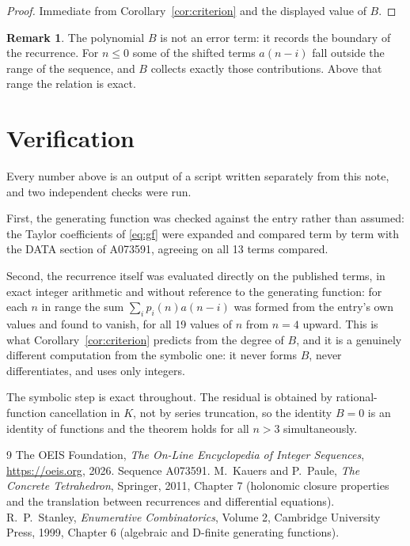 \documentclass[11pt,a4paper]{article}
\theoremstyle{plain}
\theoremstyle{definition}
\newtheorem{remark}[theorem]{Remark}
\begin{document}
\begin{proof}
Immediate from Corollary~\ref{cor:criterion} and the displayed value of $B$.
\end{proof}

\begin{remark}
The polynomial $B$ is not an error term: it records the boundary of the recurrence. For
$n\le0$ some of the shifted terms $a(n-i)$ fall outside the range of the sequence,
and $B$ collects exactly those contributions. Above that range the relation is exact.
\end{remark}

\section{Verification}

Every number above is an output of a script written separately from this note, and two
independent checks were run.

First, the generating function was checked against the entry rather than assumed: the
Taylor coefficients of \eqref{eq:gf} were expanded and compared term by term with the DATA
section of A073591, agreeing on all 13 terms compared.

Second, the recurrence itself was evaluated directly on the published terms, in exact
integer arithmetic and without reference to the generating function: for each $n$ in range
the sum $\sum_{i}p_{i}(n)a(n-i)$ was formed from the entry's own values and found to
vanish, for all 19 values of $n$ from $n=4$ upward. This is what
Corollary~\ref{cor:criterion} predicts from the degree of $B$, and it is a genuinely
different computation from the symbolic one: it never forms $B$, never differentiates, and
uses only integers.

The symbolic step is exact throughout. The residual is obtained by rational-function
cancellation in $K$, not by series truncation, so the identity $B=0$ is an
identity of functions and the theorem holds for all $n>3$ simultaneously.

\begin{thebibliography}{9}
 The OEIS Foundation, \emph{The On-Line Encyclopedia of Integer Sequences},
\url{https://oeis.org}, 2026. Sequence A073591.
 M.~Kauers and P.~Paule, \emph{The Concrete Tetrahedron}, Springer, 2011,
Chapter 7 (holonomic closure properties and the translation between recurrences and
differential equations).
 R.~P.~Stanley, \emph{Enumerative Combinatorics}, Volume 2, Cambridge
University Press, 1999, Chapter 6 (algebraic and D-finite generating functions).
\end{thebibliography}
\end{document}
